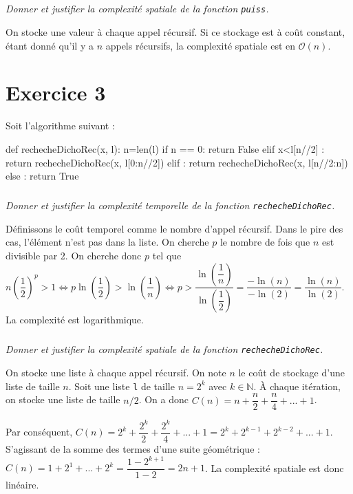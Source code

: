 \documentclass[10pt,fleqn]{book} %
\begin{document}
\begin{multicols}{2}
\subparagraph{}
\textit{Donner et justifier la complexité spatiale de la fonction \texttt{puiss}.}
\ifprof
\begin{corrige}
On stocke une valeur à chaque appel récursif. Si ce stockage est à coût constant, étant donné qu'il y a $n$ appels récursifs, la complexité spatiale est en $\mathcal{O}(n)$.
\end{corrige}
\else
\fi



\section*{Exercice 3}
\setcounter{exo}{0}

Soit l'algorithme suivant : 

\begin{py}
\begin{python}
def rechecheDichoRec(x, l):
    n=len(l)
    if n == 0:
        return False
    elif x<l[n//2] :
        return rechecheDichoRec(x, l[0:n//2])
    elif :
        return rechecheDichoRec(x, l[n//2:n])
    else :
        return True
\end{python}
\end{py}

\subparagraph{}
\textit{Donner et justifier la complexité temporelle de la fonction \texttt{rechecheDichoRec}.}
\ifprof
\begin{corrige}
Définissons le coût temporel comme le nombre d'appel récursif. Dans le pire des cas, l'élément n'est pas dans la liste. 
 On cherche $p$ le nombre de fois que $n$ est divisible par 2. On cherche donc $p$ tel que $n\left(\dfrac{1}{2}\right)^p>1 \Leftrightarrow p\ln \left(\dfrac{1}{2}\right)>\ln\left(\dfrac{1}{n}\right) \Leftrightarrow  p>\dfrac{\ln\left(\dfrac{1}{n}\right)}{\ln\left(\dfrac{1}{2}\right)} =\dfrac{-\ln\left(n\right)}{-\ln\left(2 \right)}   =\dfrac{\ln\left(n\right)}{\ln\left(2 \right)}$. La complexité est logarithmique. 
\end{corrige}
\else
\fi

\subparagraph{}
\textit{Donner et justifier la complexité spatiale de la fonction \texttt{rechecheDichoRec}.}
\ifprof
\begin{corrige}
On stocke une liste à chaque appel récursif. On note $n$ le coût de stockage d'une liste de taille $n$. Soit une liste \texttt{l} de taille $n=2^k$ avec $k\in \mathbb{N}$. 
À chaque itération, on stocke une liste de taille $n/2$.
On a donc $C(n)=n+\dfrac{n}{2}+\dfrac{n}{4}+...+1$. 

Par conséquent, $C(n)=2^k+\dfrac{2^k}{2}+\dfrac{2^k}{4}+...+1=2^k+2^{k-1}+2^{k-2}+...+1$. S'agissant de la somme des termes d'une suite géométrique :
$C(n)=1+2^1+...+2^k =\dfrac{1-2^{k+1}}{1-2} =2n+1$. La complexité spatiale est donc linéaire. 
\end{corrige}
\else
\fi



\ifprof
\else
\end{multicols}
\fi
\end{document}
